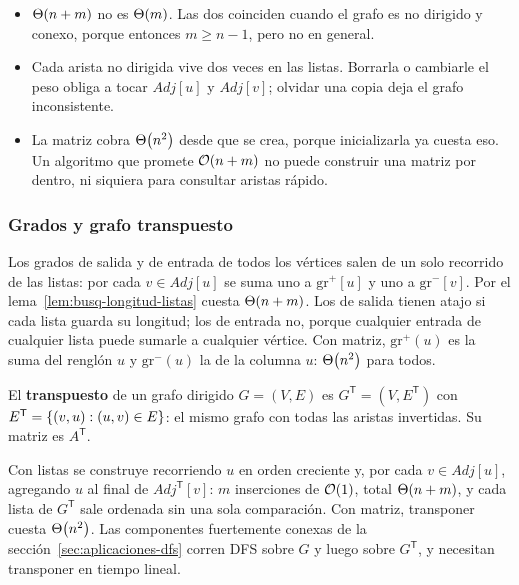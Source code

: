 \documentclass[11pt,letterpaper]{article}
\begin{document}
\begin{ojo}
  \begin{itemize}[leftmargin=1.2em, itemsep=0.15em]
    \item $\Theta\!\left(n + m\right)$ no es $\Theta\!\left(m\right)$. Las dos coinciden cuando el
      grafo es no dirigido y conexo, porque entonces $m \geq n - 1$,
      pero no en general.
    \item Cada arista no dirigida vive dos veces en las listas.
      Borrarla o cambiarle el peso obliga a tocar $\mathit{Adj}[u]$ y
      $\mathit{Adj}[v]$; olvidar una copia deja el grafo
      inconsistente.
    \item La matriz cobra $\Theta\!\left(n^2\right)$ desde que se crea, porque
      inicializarla ya cuesta eso. Un algoritmo que promete
      $\mathcal{O}\!\left(n + m\right)$ no puede construir una matriz por dentro, ni
      siquiera para consultar aristas rápido.
  \end{itemize}
\end{ojo}

\subsubsection*{Grados y grafo transpuesto}

Los grados de salida y de entrada de todos los vértices salen de un
solo recorrido de las listas: por cada $v \in \mathit{Adj}[u]$ se
suma uno a $\text{gr}^{+}[u]$ y uno a $\text{gr}^{-}[v]$. Por el
lema~\ref{lem:busq-longitud-listas} cuesta $\Theta\!\left(n + m\right)$. Los de
salida tienen atajo si cada lista guarda su longitud; los de entrada
no, porque cualquier entrada de cualquier lista puede sumarle a
cualquier vértice. Con matriz, $\text{gr}^{+}(u)$ es la suma del
renglón $u$ y $\text{gr}^{-}(u)$ la de la columna $u$: $\Theta\!\left(n^2\right)$
para todos.

\begin{definicion}
  El \textbf{transpuesto} de un grafo dirigido $G = (V, E)$ es
  $G^{\mathsf{T}} = (V, E^{\mathsf{T}})$ con
  $E^{\mathsf{T}} = \left\{ (v, u) : (u, v) \in E \right\}$: el mismo grafo con
  todas las aristas invertidas. Su matriz es $A^{\mathsf{T}}$.
\end{definicion}

Con listas se construye recorriendo $u$ en orden creciente y, por cada
$v \in \mathit{Adj}[u]$, agregando $u$ al final de
$\mathit{Adj}^{\mathsf{T}}[v]$: $m$ inserciones de $\mathcal{O}\!\left(1\right)$, total
$\Theta\!\left(n + m\right)$, y cada lista de $G^{\mathsf{T}}$ sale ordenada sin una
sola comparación. Con matriz, transponer cuesta $\Theta\!\left(n^2\right)$. Las
componentes fuertemente conexas de la
sección~\ref{sec:aplicaciones-dfs} corren DFS sobre $G$ y luego sobre
$G^{\mathsf{T}}$, y necesitan transponer en tiempo lineal.
\end{document}

